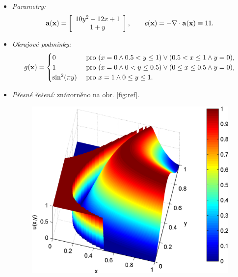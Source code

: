 \documentclass{sna}
\begin{document}
\begin{itemize}
  \item \textit{Parametry:} 
  $$
    \mathbf{a}(\mathbf{x}) = \left[\begin{array}{c} 10 y^2 -12x +1 \\ 1+y \end{array}\right],\qquad c(\mathbf{x}) = -\nabla\cdot\mathbf{a}(\mathbf{x}) \equiv 11.
  $$
  \item \textit{Okrajové podmínky:} 
  $$
    g(\mathbf{x}) = \begin{cases}
    0 & \mbox{ pro } (x = 0 \land 0.5 < y \leq 1)\lor(0.5<x\leq 1 \land y = 0),\\
    1 & \mbox{ pro } (x = 0 \land 0 < y \leq 0.5)\lor(0 \leq x\leq 0.5 \land y = 0),\\
    \sin^2(\pi y) & \mbox{ pro } x = 1 \land 0\leq y \leq 1.
    \end{cases}
  $$
  \item \textit{Přesné řešení:} znázorněno na obr. \ref{fig:ref}.
  \begin{figure}[h]
   \begin{center}
    \includegraphics[scale=.14]{exact.eps}\hspace{1.5em}

\end{center}
\end{figure}
\end{itemize}
\end{document}
